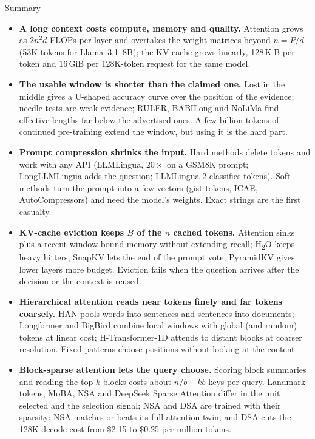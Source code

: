 \begin{frame}[allowframebreaks,t]{Summary}
  \begin{itemize}\scriptsize\itemsep0.28em
    \item[\textcolor{red}{$\blacktriangleright$}] \textbf{A long context costs compute, memory and quality.} Attention grows as $2n^2d$ FLOPs per layer and overtakes the weight matrices beyond $n = P/d$ (53K tokens for Llama~3.1~8B); the KV cache grows linearly, 128\,KiB per token and 16\,GiB per 128K-token request for the same model.
    \item[\textcolor{red}{$\blacktriangleright$}] \textbf{The usable window is shorter than the claimed one.} Lost in the middle gives a U-shaped accuracy curve over the position of the evidence; needle tests are weak evidence; RULER, BABILong and NoLiMa find effective lengths far below the advertised ones. A few billion tokens of continued pre-training extend the window, but using it is the hard part.
    \item[\textcolor{red}{$\blacktriangleright$}] \textbf{Prompt compression shrinks the input.} Hard methods delete tokens and work with any API (LLMLingua, $20\times$ on a GSM8K prompt; LongLLMLingua adds the question; LLMLingua-2 classifies tokens). Soft methods turn the prompt into a few vectors (gist tokens, ICAE, AutoCompressors) and need the model's weights. Exact strings are the first casualty.
    \item[\textcolor{red}{$\blacktriangleright$}] \textbf{KV-cache eviction keeps $B$ of the $n$ cached tokens.} Attention sinks plus a recent window bound memory without extending recall; H\textsubscript{2}O keeps heavy hitters, SnapKV lets the end of the prompt vote, PyramidKV gives lower layers more budget. Eviction fails when the question arrives after the decision or the context is reused.
    \item[\textcolor{red}{$\blacktriangleright$}] \textbf{Hierarchical attention reads near tokens finely and far tokens coarsely.} HAN pools words into sentences and sentences into documents; Longformer and BigBird combine local windows with global (and random) tokens at linear cost; H-Transformer-1D attends to distant blocks at coarser resolution. Fixed patterns choose positions without looking at the content.
    \item[\textcolor{red}{$\blacktriangleright$}] \textbf{Block-sparse attention lets the query choose.} Scoring block summaries and reading the top-$k$ blocks costs about $n/b + kb$ keys per query. Landmark tokens, MoBA, NSA and DeepSeek Sparse Attention differ in the unit selected and the selection signal; NSA and DSA are trained with their sparsity: NSA matches or beats its full-attention twin, and DSA cuts the 128K decode cost from \$2.15 to \$0.25 per million tokens.

\end{itemize}
\end{frame}
